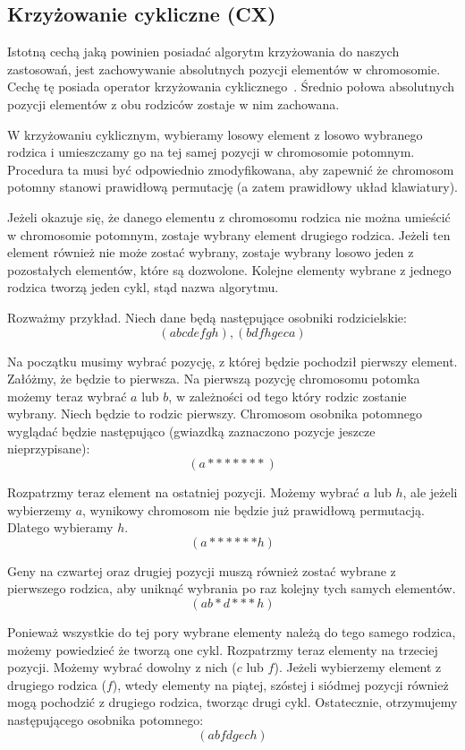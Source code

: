 \documentclass{xmgr}
\begin{document}
\subsection{Krzyżowanie cykliczne (CX)}

Istotną cechą jaką powinien posiadać algorytm krzyżowania do naszych zastosowań, jest zachowywanie absolutnych pozycji elementów w chromosomie. Cechę tę posiada operator krzyżowania cyklicznego~\cite{Oliver}. Średnio połowa absolutnych pozycji elementów z obu rodziców zostaje w nim zachowana.

W krzyżowaniu cyklicznym, wybieramy losowy element z losowo wybranego rodzica i umieszczamy go na tej samej pozycji w chromosomie potomnym. Procedura ta musi być odpowiednio zmodyfikowana, aby zapewnić że chromosom potomny stanowi prawidłową permutację (a zatem prawidłowy układ klawiatury).

Jeżeli okazuje się, że danego elementu z chromosomu rodzica nie można umieścić w chromosomie potomnym, zostaje wybrany element drugiego rodzica. Jeżeli ten element również nie może zostać wybrany, zostaje wybrany losowo jeden z pozostałych elementów, które są dozwolone. Kolejne elementy wybrane z jednego rodzica tworzą jeden cykl, stąd nazwa algorytmu.

Rozważmy przykład. Niech dane będą następujące osobniki rodzicielskie:
$$ (a b c d e f g h), (b d f h g e c a) $$

Na początku musimy wybrać pozycję, z której będzie pochodził pierwszy element. Załóżmy, że będzie to pierwsza. Na pierwszą pozycję chromosomu potomka możemy teraz wybrać $a$ lub $b$, w zależności od tego który rodzic zostanie wybrany. Niech będzie to rodzic pierwszy. Chromosom osobnika potomnego wyglądać będzie następująco (gwiazdką zaznaczono pozycje jeszcze nieprzypisane):
$$ (a * * * * * * *) $$

Rozpatrzmy teraz element na ostatniej pozycji. Możemy wybrać $a$ lub $h$, ale jeżeli wybierzemy $a$, wynikowy chromosom nie będzie już prawidłową permutacją. Dlatego wybieramy $h$.
$$ (a * * * * * * h) $$

Geny na czwartej oraz drugiej pozycji muszą również zostać wybrane z pierwszego rodzica, aby uniknąć wybrania po raz kolejny tych samych elementów.
$$ (a b * d * * * h) $$

Ponieważ wszystkie do tej pory wybrane elementy należą do tego samego rodzica, możemy powiedzieć że tworzą one cykl. Rozpatrzmy teraz elementy na trzeciej pozycji. Możemy wybrać dowolny z nich ($c$ lub $f$). Jeżeli wybierzemy element z drugiego rodzica ($f$), wtedy elementy na piątej, szóstej i siódmej pozycji również mogą pochodzić z drugiego rodzica, tworząc drugi cykl. Ostatecznie, otrzymujemy następującego osobnika potomnego:
$$ (a b f d g e c h) $$
\end{document}
